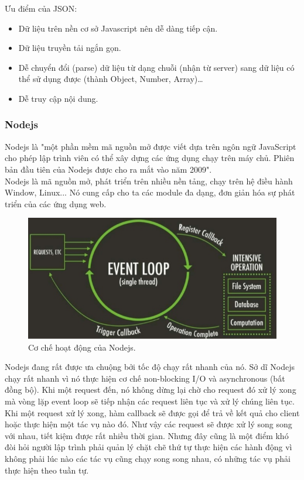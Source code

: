 \documentclass[a4paper,12pt,oneside]{article}
\begin{document}
Ưu điểm của JSON:
\begin{itemize}
\item Dữ liệu trên nền cơ sở Javascript nên dễ dàng tiếp cận.
\item Dữ liệu truyền tải ngắn gọn.
\item Dễ chuyển đổi (parse) dữ liệu từ dạng chuỗi (nhận từ server) sang dữ liệu có thể sử dụng được (thành Object, Number, Array)…
\item Dễ truy cập nội dung.
\end{itemize}

\subsubsection{Nodejs}
\noindent Nodejs là "một phần mềm mã nguồn mở được viết dựa trên ngôn ngữ JavaScript cho phép lập trình viên có thể xây dựng các ứng dụng chạy trên máy chủ. Phiên bản đầu tiên của Nodejs được cho ra mắt vào năm 2009"\cite{nodejs}.\\
Nodejs là mã nguồn mở, phát triển trên nhiều nền tảng, chạy trên hệ điều hành Window, Linux... Nó cung cấp cho ta các module đa dạng, đơn giản hóa sự phát triển của các ứng dụng web.

\begin{figure}[H]
	\centering
	\includegraphics[scale=.8]{hinh/nodejs.png}
	\caption{Cơ chế hoạt động của Nodejs\cite{nodejs}.}
	\label{fig:nodejs}
\end{figure}

\noindent Nodejs đang rất được ưa chuộng bởi tốc độ chạy rất nhanh của nó. Sở dĩ Nodejs chạy rất nhanh vì nó thực hiện cơ chế non-blocking I/O và asynchronous (bất đồng bộ). Khi một request đến, nó không dừng lại chờ cho request đó xử lý xong mà vòng lặp event loop sẽ tiếp nhận các request liên tục và xử lý chúng liên tục. Khi một request xử lý xong, hàm callback sẽ được gọi để trả về kết quả cho client hoặc thực hiện một tác vụ nào đó. Như vậy các request sẽ được xử lý song song với nhau, tiết kiệm được rất nhiều thời gian. Nhưng đây cũng là một điểm khó đòi hỏi người lập trình phải quản lý chặt chẽ thứ tự thực hiện các hành động vì không phải lúc nào các tác vụ cũng chạy song song nhau, có những tác vụ phải thực hiện theo tuần tự.
\end{document}
